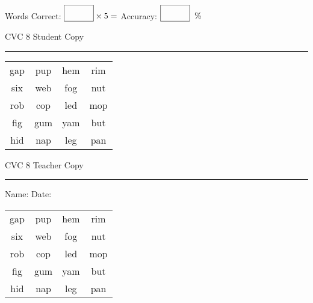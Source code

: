 \documentclass{memoir}
\begin{document}
\normalsize

Words Correct: $\fbox{\phantom{\huge 100}} \times 5 = $ Accuracy: $\fbox{\phantom{\huge 100}}\;\; \%$ 

\vfill

\newpage


\footnotesize \noindent
CVC 8 \hfill Student Copy
\smallskip
\hrule

\huge

\setlength{\tabcolsep}{14pt}
\def\arraystretch{2}

{\selectfont


\begin{vplace}[0.5]
\begin{center}
\begin{tabular}{cccc}
gap & pup & hem & rim \\
six & web & fog & nut \\
rob & cop & led & mop \\
fig & gum  & yam & but \\
hid & nap & leg & pan \\
\end{tabular}
\end{center}
\end{vplace}

}

\newpage

\footnotesize \noindent
CVC 8 \hfill Teacher Copy
\smallskip
\hrule

\normalsize

\vfill

\noindent
Name: \underline{\hspace{1.75in}} \hfill Date: \underline{\hspace{1in}}

\huge

{\selectfont


\begin{vplace}[0.5]
\begin{center}
\begin{tabular}{cccc}
gap & pup & hem & rim \\
six & web & fog & nut \\
rob & cop & led & mop \\
fig & gum  & yam & but \\
hid & nap & leg & pan \\
\end{tabular}
\end{center}
\end{vplace}



}
\end{document}
